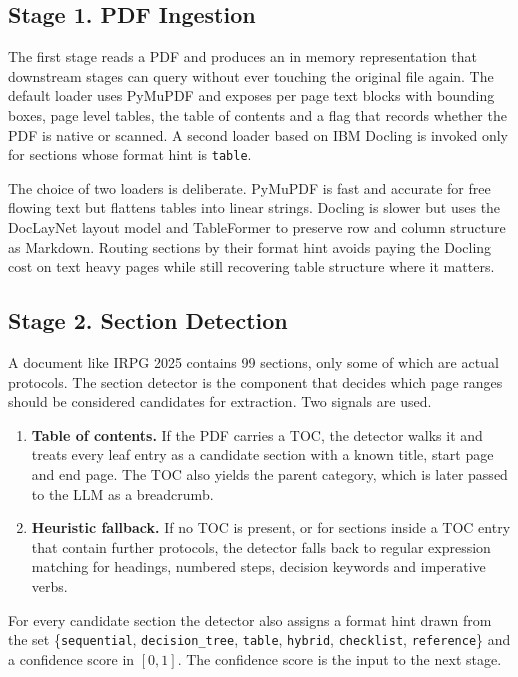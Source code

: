 \documentclass{article}
\begin{document}
\subsection{Stage 1. PDF Ingestion}

The first stage reads a PDF and produces an in memory representation
that downstream stages can query without ever touching the original
file again. The default loader uses PyMuPDF and exposes per page text
blocks with bounding boxes, page level tables, the table of contents
and a flag that records whether the PDF is native or scanned. A second
loader based on IBM Docling is invoked only for sections whose format
hint is \texttt{table}.

\begin{importantnote}
The choice of two loaders is deliberate. PyMuPDF is fast and accurate
for free flowing text but flattens tables into linear strings.
Docling is slower but uses the DocLayNet layout model and TableFormer
to preserve row and column structure as Markdown. Routing sections by
their format hint avoids paying the Docling cost on text heavy pages
while still recovering table structure where it matters.
\end{importantnote}

\subsection{Stage 2. Section Detection}

A document like IRPG 2025 contains 99 sections, only some of which are
actual protocols. The section detector is the component that decides
which page ranges should be considered candidates for extraction. Two
signals are used.

\begin{enumerate}[leftmargin=2em]
    \item \textbf{Table of contents.} If the PDF carries a TOC, the
    detector walks it and treats every leaf entry as a candidate
    section with a known title, start page and end page. The TOC also
    yields the parent category, which is later passed to the LLM as a
    breadcrumb.
    \item \textbf{Heuristic fallback.} If no TOC is present, or for
    sections inside a TOC entry that contain further protocols, the
    detector falls back to regular expression matching for headings,
    numbered steps, decision keywords and imperative verbs.
\end{enumerate}

For every candidate section the detector also assigns a format hint
drawn from the set \{\texttt{sequential}, \texttt{decision\_tree},
\texttt{table}, \texttt{hybrid}, \texttt{checklist},
\texttt{reference}\} and a confidence score in $[0, 1]$. The
confidence score is the input to the next stage.
\end{document}
